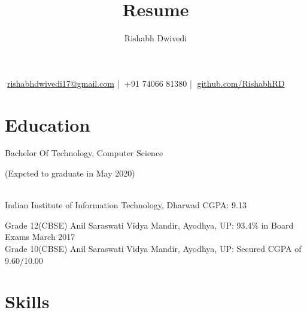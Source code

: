 \documentclass{article}
\author{Rishabh Dwivedi}
\title{Resume}
\begin{document}
\newcommand{\prj}[3]{
	\begin{minipage}{0.6\textwidth} \underline{\textbf{#1}} \end{minipage}
	\begin{minipage}{0.4\textwidth}\begin{flushright} {\small(#3)} \end{flushright}\end{minipage}\linebreak
	{\small(\url{https://github.com/#2})}\\
}

\renewcommand{\maketitle}{
	\begin{center}
		{\huge\bfseries\theauthor}

		\vspace{0.25mm}
		{\DejaSans 📧}\href{mailto:rishabhdwivedi17@gmail.com}{rishabhdwivedi17@gmail.com} | {\DejaSans }+91 74066 81380 | {\DejaSans }\url{github.com/RishabhRD}
	\end{center}
	}
\maketitle

\section{Education}
\footnotesize{
	\begin{minipage}{0.6\textwidth}
		Bachelor Of Technology, Computer Science 
	\end{minipage}
	\begin{minipage}{0.3\textwidth}
		\begin{flushright}
(Expcted to graduate in May 2020)
\end{flushright}
	\end{minipage}
\\Indian Institute of Information Technology, Dharwad	
CGPA: 9.13

Grade 12(CBSE)
Anil Saraswati Vidya Mandir, Ayodhya, UP: 93.4\% in Board Exams March 2017\\
Grade 10(CBSE)
Anil Saraswati Vidya Mandir, Ayodhya, UP: Secured CGPA of 9.60/10.00\\
}
\section{Skills}
\end{document}
